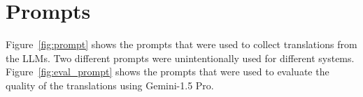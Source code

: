 \section{Prompts}
\label{appendix:prompts}
Figure~\ref{fig:prompt} shows the prompts that were used to collect translations from the LLMs.
Two different prompts were unintentionally used for different systems.
Figure~\ref{fig:eval_prompt} shows the prompts that were used to evaluate the quality of the translations using Gemini-1.5 Pro.


